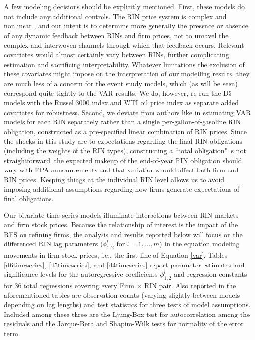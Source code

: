 \documentclass[11pt]{article}
\begin{document}
A few modeling decisions should be explicitly mentioned. First, these models do not include any additional controls. The RIN price system is complex and nonlinear \citep{Serra2011}, and our intent is to determine more generally the presence or absence of any dynamic feedback between RINs and firm prices, not to unravel the complex and interwoven channels through which that feedback occurs. Relevant covariates would almost certainly vary between RINs, further complicating estimation and sacrificing interpretability. Whatever limitations the exclusion of these covariates might impose on the interpretation of our modelling results, they are much less of a concern for the event study models, which (as will be seen) correspond quite tightly to the VAR results. We do, however, re-run the D5 models with the Russel 3000 index and WTI oil price index as separate added covariates for robustness. Second, we deviate from authors like \cite{Knittel2017} in estimating VAR models for each RIN separately rather than a single per-gallon-of-gasoline RIN obligation, constructed as a pre-specified linear combination of RIN prices. Since the shocks in this study are to expectations regarding the final RIN obligations (including the weights of the  RIN types), constructing a ``total obligation" is not straightforward; the expected makeup of the end-of-year RIN obligation should vary with EPA announcements and that variation should affect both firm and RIN prices. Keeping things at the individual RIN level allows us to avoid imposing additional assumptions regarding how firms generate expectations of final obligations.

Our bivariate time series models illuminate interactions between RIN markets and firm stock prices. Because the relationship of interest is the impact of the RFS on refining firms, the analysis and results reported below will focus on the differenced RIN lag parameters ($\phi_{1,2}^l$ for $l=1,\dots,m$) in the equation modeling movements in firm stock prices, i.e., the first line of Equation \ref{var}. Tables \ref{d6timeseries}, \ref{d5timeseries}, and \ref{d4timeseries} report parameter estimates and significance levels for the autoregressive coefficients $\phi_{1,2}^l$ and regression constants for 36 total regressions covering every Firm $\times$ RIN pair. Also reported in the aforementioned tables are observation counts (varying slightly between models depending on lag lengths) and test statistics for three tests of model assumptions. Included among these three are the Ljung-Box test for autocorrelation among the residuals and the Jarque-Bera and Shapiro-Wilk tests for normality of the error term.
\end{document}
